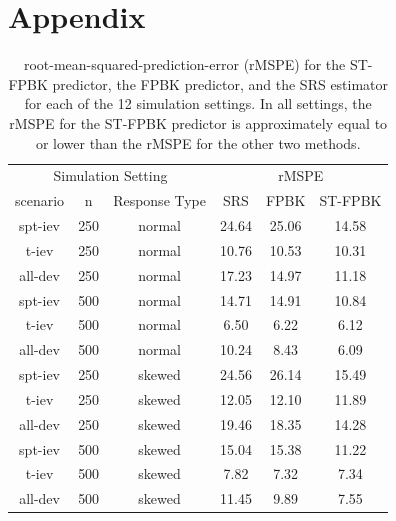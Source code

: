 \documentclass[smallextended]{svjour3}       %
\begin{document}
\setcounter{table}{0}
\renewcommand{\thetable}{A\arabic{table}}

\hypertarget{appendix}{%
\section*{Appendix}\label{appendix}}

\begin{table}[H]

\caption{\label{tab:simrmspetab}root-mean-squared-prediction-error (rMSPE) for the ST-FPBK predictor, the FPBK predictor, and the SRS estimator for each of the 12 simulation settings. In all settings, the rMSPE for the ST-FPBK predictor is approximately equal to or lower than the rMSPE for the other two methods.}
\centering
\begin{tabular}[t]{cccccc}
\toprule
\multicolumn{3}{c}{Simulation Setting} & \multicolumn{3}{c}{rMSPE} \\
\cmidrule(l{3pt}r{3pt}){1-3} \cmidrule(l{3pt}r{3pt}){4-6}
scenario & n & Response Type & SRS & FPBK & ST-FPBK\\
\midrule
spt-iev & 250 & normal & 24.64 & 25.06 & 14.58\\
t-iev & 250 & normal & 10.76 & 10.53 & 10.31\\
all-dev & 250 & normal & 17.23 & 14.97 & 11.18\\
\midrule
spt-iev & 500 & normal & 14.71 & 14.91 & 10.84\\
t-iev & 500 & normal & 6.50 & 6.22 & 6.12\\
all-dev & 500 & normal & 10.24 & 8.43 & 6.09\\
\midrule
spt-iev & 250 & skewed & 24.56 & 26.14 & 15.49\\
t-iev & 250 & skewed & 12.05 & 12.10 & 11.89\\
all-dev & 250 & skewed & 19.46 & 18.35 & 14.28\\
\midrule
spt-iev & 500 & skewed & 15.04 & 15.38 & 11.22\\
t-iev & 500 & skewed & 7.82 & 7.32 & 7.34\\
all-dev & 500 & skewed & 11.45 & 9.89 & 7.55\\
\bottomrule
\end{tabular}
\end{table}
\end{document}
